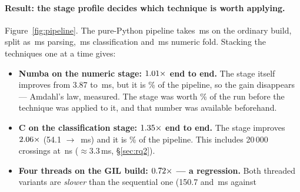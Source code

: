 \paragraph{Result: the stage profile decides which technique is worth applying.}
Figure~\ref{fig:pipeline}. The pure-Python pipeline takes \,ms on the
ordinary build, split as \,ms parsing, \,ms classification and \,ms numeric fold.
Stacking the techniques one at a time gives:

\begin{itemize}[leftmargin=1.4em,itemsep=1pt]
  \item \textbf{Numba on the numeric stage: $\meas{ratio:b7_pipeline-gil:end_to_end/gil/v0_pure|b7_pipeline-gil:end_to_end/gil/v1_numba}{1.01}\times$ end to end.} The stage itself
        improves from 3.87 to \,ms, but it is \% of the pipeline, so the gain
        disappears --- Amdahl's law, measured. The stage was worth \% of the run before
        the technique was applied to it, and that number was available beforehand.
  \item \textbf{C on the classification stage: $\meas{ratio:b7_pipeline-gil:end_to_end/gil/v0_pure|b7_pipeline-gil:end_to_end/gil/v2_numba_native}{1.35}\times$ end to end.} The stage improves
        $\meas{ratio:b7_pipeline-gil:stage_validate/gil/v0_pure|b7_pipeline-gil:stage_validate/gil/v2_native}{2.06}\times$ (54.1 $\to$ \,ms) and it is \% of the pipeline. This
        includes 20\,000  crossings at \,ns
        ($\approx 3.3$\,ms, \S\ref{sec:rq2}).
  \item \textbf{Four threads on the GIL build: $\meas{ratio:b7_pipeline-gil:end_to_end/gil/v0_pure|b7_pipeline-gil:end_to_end/gil/v3_native_threads}{0.72}\times$ --- a regression.} Both threaded
        variants are \emph{slower} than the sequential one (150.7 and \,ms against

\end{itemize}
